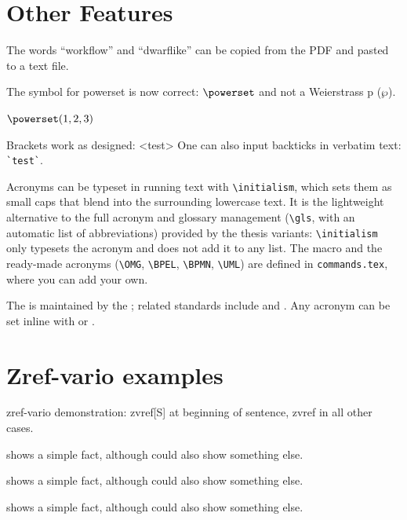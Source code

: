 
\section{Other Features}

\begin{ltgexample}
The words \enquote{workflow} and \enquote{dwarflike} can be copied from the PDF and pasted to a text file.
\end{ltgexample}

\begin{ltgexample}
The symbol for powerset is now correct: $\powerset$ and not a Weierstrass p ($\wp$).

$\powerset({1,2,3})$
\end{ltgexample}

\begin{ltgexample}
Brackets work as designed:
<test>
One can also input backticks in verbatim text: \verb|`test`|.
\end{ltgexample}

Acronyms can be typeset in running text with \verb+\initialism+, which sets them as small caps that blend into the surrounding lowercase text. It is the lightweight alternative to the full acronym and glossary management (\verb+\gls+, with an automatic list of abbreviations) provided by the thesis variants: \verb+\initialism+ only typesets the acronym and does not add it to any list. The macro and the ready-made acronyms (\verb+\OMG+, \verb+\BPEL+, \verb+\BPMN+, \verb+\UML+) are defined in \texttt{commands.tex}, where you can add your own.

\begin{ltgexample}
The \UML is maintained by the \OMG; related standards include \BPEL and \BPMN.
Any acronym can be set inline with  or .
\end{ltgexample}


\section{Zref-vario examples}
\label{sec:ex:vref}

zref-vario demonstration: zvref[S] at beginning of sentence, zvref in all other cases.

\begin{ltgexample}
 shows a simple fact, although  could also show something else.

 shows a simple fact, although  could also show something else.

 shows a simple fact, although  could also show something else.
\end{ltgexample}

